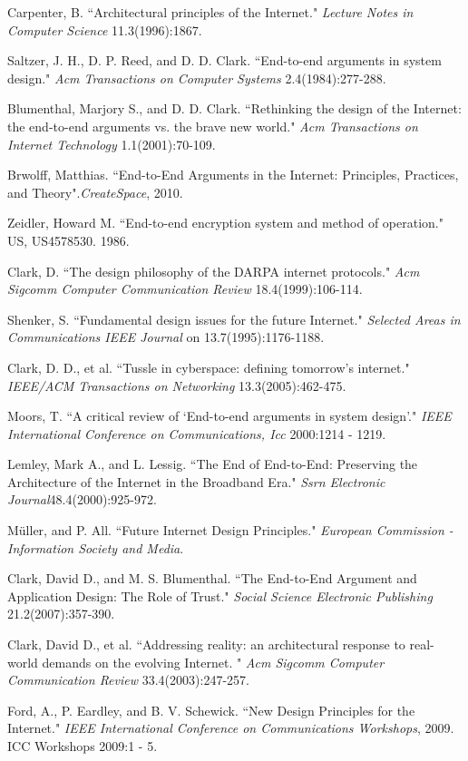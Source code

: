 \documentclass[11pt,twocolumn]{article}
\begin{document}
\begin{thebibliography}{1}

Carpenter, B. ``Architectural principles of the Internet." \emph{Lecture Notes in Computer Science} 11.3(1996):1867.

Saltzer, J. H., D. P. Reed, and D. D. Clark. ``End-to-end arguments in system design." \emph{Acm Transactions on Computer Systems} 2.4(1984):277-288.

Blumenthal, Marjory S., and D. D. Clark. ``Rethinking the design of the Internet: the end-to-end arguments vs. the brave new world." \emph{Acm Transactions on Internet Technology} 1.1(2001):70-109.

Brwolff, Matthias. ``End-to-End Arguments in the Internet: Principles, Practices, and Theory".\emph{CreateSpace}, 2010.

Zeidler, Howard M. ``End-to-end encryption system and method of operation." US, US4578530. 1986.

Clark, D. ``The design philosophy of the DARPA internet protocols." \emph{Acm Sigcomm Computer Communication Review} 18.4(1999):106-114.

Shenker, S. ``Fundamental design issues for the future Internet." \emph{Selected Areas in Communications IEEE Journal} on 13.7(1995):1176-1188.

Clark, D. D., et al. ``Tussle in cyberspace: defining tomorrow's internet." \emph{IEEE/ACM Transactions on Networking} 13.3(2005):462-475.


Moors, T. ``A critical review of `End-to-end arguments in system design'." \emph{IEEE International Conference on Communications, Icc} 2000:1214 - 1219.

Lemley, Mark A., and L. Lessig. ``The End of End-to-End: Preserving the Architecture of the Internet in the Broadband Era." \emph{Ssrn Electronic Journal}48.4(2000):925-972.

Müller, and P. All. ``Future Internet Design Principles." \emph{European Commission - Information Society and Media}.

Clark, David D., and M. S. Blumenthal. ``The End-to-End Argument and Application Design: The Role of Trust." \emph{Social Science Electronic Publishing} 21.2(2007):357-390.

Clark, David D., et al. ``Addressing reality: an architectural response to real-world demands on the evolving Internet. " \emph{Acm Sigcomm Computer Communication Review} 33.4(2003):247-257.

Ford, A., P. Eardley, and B. V. Schewick. ``New Design Principles for the Internet." \emph{IEEE International Conference on Communications Workshops}, 2009. ICC Workshops 2009:1 - 5.

\end{thebibliography}
\end{document}
